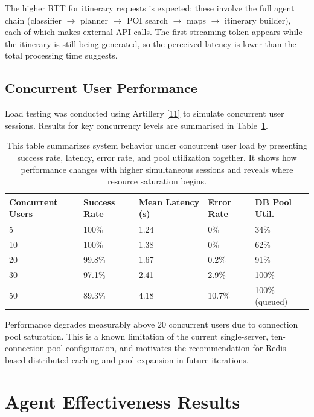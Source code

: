 \documentclass[12pt,a4paper]{report}
\newcommand{\tableexpl}[1]{\caption*{\small #1}}
\newcommand{\chapcite}[1]{\hyperlink{ref:#1}{[#1]}}
\newcommand{\chapcitetarget}[1]{\hypertarget{cite:#1}{}\chapcite{#1}}
\begin{document}
The higher RTT for itinerary requests is expected: these involve the full agent chain (classifier $\to$ planner $\to$ POI search $\to$ maps $\to$ itinerary builder), each of which makes external API calls. The first streaming token appears while the itinerary is still being generated, so the perceived latency is lower than the total processing time suggests.

\subsection{Concurrent User Performance}

Load testing was conducted using Artillery \chapcitetarget{11} to simulate concurrent user sessions. Results for key concurrency levels are summarised in Table~\ref{tab:load_test}.

\begin{table}[H]
\centering
\caption{Concurrent Session Load Test Results}
\tableexpl{This table summarizes system behavior under concurrent user load by presenting success rate, latency, error rate, and pool utilization together. It shows how performance changes with higher simultaneous sessions and reveals where resource saturation begins.}
\label{tab:load_test}
\begin{tabular}{lllll}
\toprule
\textbf{Concurrent Users} & \textbf{Success Rate} & \textbf{Mean Latency (s)} & \textbf{Error Rate} & \textbf{DB Pool Util.} \\
\midrule
5   & 100\% & 1.24 & 0\% & 34\% \\
10  & 100\% & 1.38 & 0\% & 62\% \\
20  & 99.8\% & 1.67 & 0.2\% & 91\% \\
30  & 97.1\% & 2.41 & 2.9\% & 100\% \\
50  & 89.3\% & 4.18 & 10.7\% & 100\% (queued) \\
\bottomrule
\end{tabular}
\end{table}

Performance degrades measurably above 20 concurrent users due to connection pool saturation. This is a known limitation of the current single-server, ten-connection pool configuration, and motivates the recommendation for Redis-based distributed caching and pool expansion in future iterations.

\section{Agent Effectiveness Results}
\end{document}

